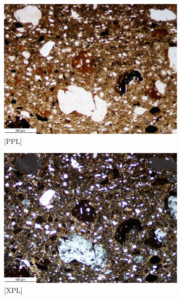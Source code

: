 \documentclass[a4paper]{article}
\begin{document}

\begin{figure}[H]
	\centering
	\begin{subfigure}[t]{.49\textwidth}
		\includegraphics[width=\textwidth]{ThinSections/11-2_4x_PPL.jpg}
		\caption{[PPL]}
	\end{subfigure}\hspace{.5em}\hfill
	\begin{subfigure}[t]{.49\textwidth}
		\includegraphics[width=\textwidth]{ThinSections/11-2_4x_XPL.jpg}
		\caption{[XPL]}
	\end{subfigure}
	\begin{subfigure}[t]{.49\textwidth}

\end{subfigure}
\end{figure}
\end{document}
